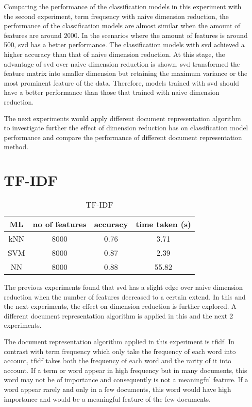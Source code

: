 Comparing the performance of the classification models in this experiment with the second experiment, term frequency with naive dimension reduction, the performance of the classification models are almost similar when the amount of features are around 2000. In the scenarios where the amount of features is around 500, \ac{svd} has a better performance. The classification models with \ac{svd} achieved a higher accuracy than that of naive dimension reduction. At this stage, the advantage of \ac{svd} over naive dimension reduction is shown. \Ac{svd} transformed the feature matrix into smaller dimension but retaining the maximum variance or the most prominent feature of the data. Therefore, models trained with \ac{svd} should have a better performance than those that trained with naive dimension reduction.

The next experiments would apply different document representation algorithm to investigate further the effect of dimension reduction has on classification model performance and compare the performance of different document representation method.\\

\section{TF-IDF}

\begin{table} [ht]
	\centering
	\begin{tabular}{|| c | c | c | c||}
		\hline
		ML & no of features & accuracy & time taken (s) \\ [0.5ex]
		\hline\hline
		kNN & 8000 & 0.76 & 3.71 \\ 
		\hline
		SVM & 8000 & 0.87 & 2.39 \\
		\hline
		NN & 8000 & 0.88 & 55.82 \\
		\hline
	\end{tabular}
\caption{TF-IDF}
\label{tbl:tfidf}
\end{table}

The previous experiments found that \ac{svd} has a slight edge over naive dimension reduction when the number of features decreased to a certain extend. In this and the next experiments, the effect on dimension reduction is further explored. A different document representation algorithm is applied in this and the next 2 experiments.
 
The document representation algorithm applied in this experiment is \ac{tfidf}. In contrast with term frequency which only take the frequency of each word into account, \ac{tfidf} takes both the frequency of each word and the rarity of it into account. If a term or word appear in high frequency but in many documents, this word may not be of importance and consequently is not a meaningful feature. If a word appear rarely and only in a few documents, this word would have high importance and would be a meaningful feature of the few documents.

